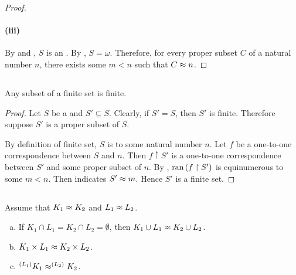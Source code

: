 \documentclass{report}
\begin{document}
\begin{proof}
    \paragraph{(iii)}%

      By  and , $S$ is an
        .
      By , $S = \omega$.
      Therefore, for every proper subset $C$ of a natural number $n$, there
        exists some $m < n$ such that $C \approx n$.

  \end{proof}

\subsection{}%

  \begin{corollary}[6G]
    Any subset of a finite set is finite.
  \end{corollary}

  \begin{proof}
    Let $S$ be a  and $S' \subseteq S$.
    Clearly, if $S' = S$, then $S'$ is finite.
    Therefore suppose $S'$ is a proper subset of $S$.

    By definition of finite set, $S$ is  to some
      natural number $n$.
    Let $f$ be a one-to-one correspondence between $S$ and $n$.
    Then $f \restriction S'$ is a one-to-one correspondence between $S'$ and
      some proper subset of $n$.
    By , $\mathop{\text{ran}}{(f \restriction S')}$ is equinumerous to
      some $m < n$.
    Then  indicates $S' \approx m$.
    Hence $S'$ is a finite set.
  \end{proof}

\subsection{}%

  Assume that $K_1 \approx K_2$ and $L_1 \approx L_2$.
    \begin{enumerate}[(a)]
      \item If $K_1 \cap L_1 = K_2 \cap L_2 = \emptyset$, then
        $K_1 \cup L_1 \approx K_2 \cup L_2$.
      \item $K_1 \times L_1 \approx K_2 \times L_2$.
      \item $^{(L_1)}{K_1} \approx ^{(L_2)}{K_2}$.
    \end{enumerate}
\end{document}
